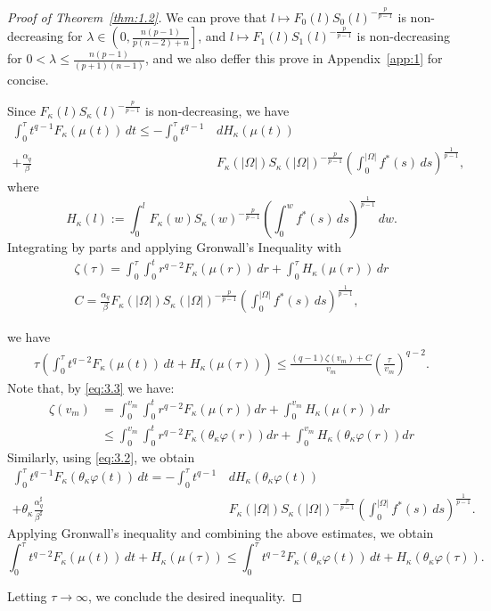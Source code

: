 \documentclass[11pt]{article}
\numberwithin{equation}{section}
\theoremstyle{definition}
\theoremstyle{remark}
\begin{document}
\begin{proof}[Proof of Theorem~\ref{thm:1.2}]
We can prove that 
$l \mapsto F_0(l)S_0(l)^{-\frac{p}{p-1}}$ is non-decreasing for
$\lambda\in\left(0,\frac{n(p-1)}{p(n-2)+n}\right]$, and $ l \mapsto F_1(l)S_1(l)^{-\frac{p}{p-1}}$ is non-decreasing 
for $ 0 < \lambda \le \frac{n(p-1)}{(p+1)(n-1)}$, and we also deffer this prove in Appendix~\ref{app:1} for concise.\par

Since $F_\kappa(l)S_\kappa(l)^{-\frac{p}{p-1}}$ is non-decreasing, we have
\begin{align*}
\int_0^\tau t^{q-1} F_\kappa(\mu(t))\,dt
\le
-\int_0^\tau t^{q-1}\,&dH_\kappa(\mu(t))
\\+\frac{\alpha_q}{\beta}&
F_\kappa(|\Omega|)S_\kappa(|\Omega|)^{-\frac{p}{p-1}}
\left(\int_0^{|\Omega|} f^*(s)\,ds\right)^{\frac{1}{p-1}},
\end{align*}
where
\[
H_\kappa(l)
:=
\int_0^l
F_\kappa(w)S_\kappa(w)^{-\frac{p}{p-1}}
\left(\int_0^w f^*(s)\,ds\right)^\frac{1}{p-1}\,dw.
\]
Integrating by parts and applying Gronwall's Inequality with
\begin{align*}
\zeta(\tau) = \int_0^\tau \int_0^t r^{q-2} F_\kappa(\mu(r))\,dr + \int_0^\tau H_\kappa(\mu(r)) \,dr\\
C = \frac{\alpha_q}{\beta}
F_\kappa(|\Omega|)S_\kappa(|\Omega|)^{-\frac{p}{p-1}}
\left(\int_0^{|\Omega|} f^*(s)\,ds\right)^{\frac{1}{p-1}},
\end{align*}

we have
   \begin{align*}
\tau\left(\int_0^\tau  t^{q-2}F_\kappa(\mu(t))\,dt + H_\kappa(\mu(\tau))\right)
\le
\frac{(q-1)\zeta(v_m)+C}{v_m}\left(\frac{\tau}{v_m}\right)^{q-2}
.
\end{align*}
Note that, by \eqref{eq:3.3} we have:
\begin{align*}
\zeta(v_m)&=\int_0^{v_m}\int_0^t r^{q-2}F_\kappa(\mu(r))dr + \int_0^{v_m} H_\kappa(\mu(r)) dr
\\
&\le\int_0^{v_m}\int_0^t r^{q-2}F_\kappa(\theta_\kappa\varphi(r))dr + \int_0^{v_m} H_\kappa(\theta_\kappa\varphi(r)) dr
\end{align*}
Similarly, using \eqref{eq:3.2}, we obtain
\begin{align*}
\int_0^\tau t^{q-1} F_\kappa(\theta_\kappa \varphi(t))\,dt
=
-\int_0^\tau t^{q-1}\,&dH_\kappa(\theta_\kappa \varphi(t))
\\+\theta_\kappa\frac{\alpha_q^\sharp}{\beta^\sharp}&
F_\kappa(|\Omega|)S_\kappa(|\Omega|)^{-\frac{p}{p-1}}
\left(\int_0^{|\Omega|} f^*(s)\,ds\right)^{\frac{1}{p-1}}.
\end{align*}
Applying Gronwall's inequality and combining the above estimates, we obtain
\[
\int_0^\tau t^{q-2} F_\kappa(\mu(t))\,dt + H_\kappa(\mu(\tau))
\le
\int_0^\tau t^{q-2} F_\kappa(\theta_\kappa \varphi(t))\,dt + H_\kappa(\theta_\kappa \varphi(\tau)).
\]

Letting $\tau\to\infty$, we conclude the desired inequality.
\end{proof}
\end{document}
